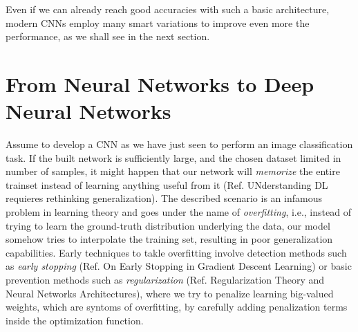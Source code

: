 \documentclass[LaM,binding=0.6cm]{./packages/sapthesis/sapthesis}
\begin{document}
            Even if we can already reach good accuracies with such a basic architecture, modern CNNs employ many smart variations to improve even more the performance,
            as we shall see in the next section. 

        \section{From Neural Networks to Deep Neural Networks}
        \label{dnns}
        Assume to develop a CNN as we have just seen to perform an image classification task. If the built network is sufficiently large, and the chosen dataset limited
        in number of samples, it might happen that our network will \textit{memorize} the entire trainset instead of learning anything useful from it (Ref. 
        UNderstanding DL requieres rethinking generalization). The described scenario is an infamous problem in learning theory and goes under the name of \textit{overfitting},
        i.e., instead of trying to learn the ground-truth distribution underlying the data, our model somehow tries to interpolate the training set, 
        resulting in poor generalization capabilities. 
        Early techniques to takle overfitting involve detection methods such as \textit{early stopping} (Ref. On Early Stopping in Gradient Descent Learning) 
        or basic prevention methods such as \textit{regularization} (Ref. Regularization Theory and Neural Networks Architectures),
        where we try to penalize learning big-valued weights, which are syntoms of overfitting, by carefully adding penalization terms inside the optimization function.
\end{document}
